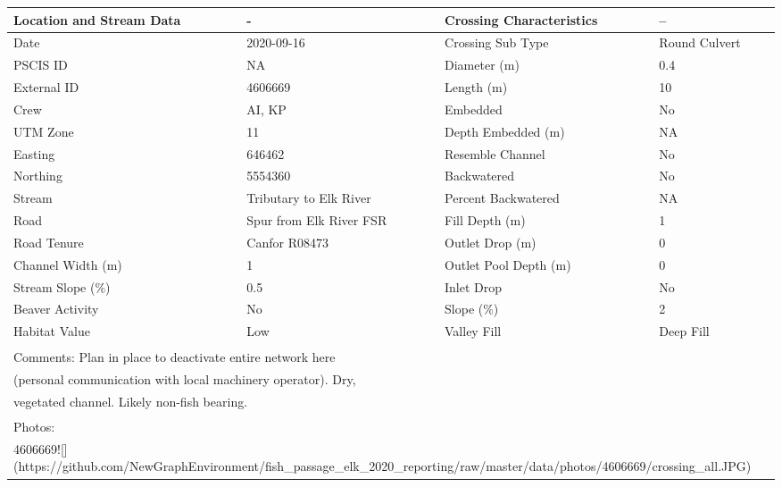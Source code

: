 \documentclass[
]{book}
\begin{document}
\begin{tabular}{l|l|l|l}
\hline
Location and Stream Data & - & Crossing Characteristics & --\\
\hline
Date & 2020-09-16 & Crossing Sub Type & Round Culvert\\
\hline
PSCIS ID & NA & Diameter (m) & 0.4\\
\hline
External ID & 4606669 & Length (m) & 10\\
\hline
Crew & AI, KP & Embedded & No\\
\hline
UTM Zone & 11 & Depth Embedded (m) & NA\\
\hline
Easting & 646462 & Resemble Channel & No\\
\hline
Northing & 5554360 & Backwatered & No\\
\hline
Stream & Tributary to Elk River & Percent Backwatered & NA\\
\hline
Road & Spur from Elk River FSR & Fill Depth (m) & 1\\
\hline
Road Tenure & Canfor R08473 & Outlet Drop (m) & 0\\
\hline
Channel Width (m) & 1 & Outlet Pool Depth (m) & 0\\
\hline
Stream Slope (\%) & 0.5 & Inlet Drop & No\\
\hline
Beaver Activity & No & Slope (\%) & 2\\
\hline
Habitat Value & Low & Valley Fill & Deep Fill\\
\hline
\multicolumn{4}{l}{\textsuperscript{} Comments: Plan in place to deactivate entire network here}\\
\multicolumn{4}{l}{(personal communication with local machinery operator). Dry,}\\
\multicolumn{4}{l}{vegetated channel. Likely non-fish bearing.}\\
\multicolumn{4}{l}{\textsuperscript{} Photos:}\\
\multicolumn{4}{l}{4606669![](https://github.com/NewGraphEnvironment/fish\_passage\_elk\_2020\_reporting/raw/master/data/photos/4606669/crossing\_all.JPG)}\\
\end{tabular}
\end{document}
